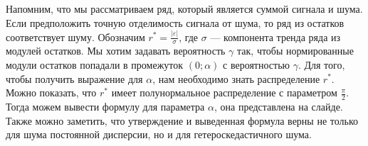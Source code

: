 \documentclass[10pt, ucs, notheorems, handout]{beamer}
\begin{document}
\begin{frame}
{{	Напомним, что мы рассматриваем ряд, который является суммой сигнала и шума.
	Если предположить точную отделимость сигнала от шума, то ряд из остатков соответствует шуму.  Обозначим $r^* = \frac{|\varepsilon|}{\sigma}$, где $\sigma$ --- компонента тренда ряда из модулей остатков.  
	Мы хотим задавать вероятность $\gamma$ так, чтобы нормированные модули остатков попадали в промежуток $(0;\alpha)$ с вероятностью $\gamma$. Для того, чтобы получить выражение для $\alpha$, нам необходимо знать распределение $r^*$. Можно показать, что $r^*$ имеет полунормальное распределение с параметром $\frac{\pi}{2}$. Тогда можем вывести формулу для параметра $\alpha$, она представлена на слайде. Также можно заметить, что утверждение и выведенная формула верны не только для шума постоянной дисперсии, но и для гетероскедастичного шума.
}
}
\end{frame}
\end{document}
